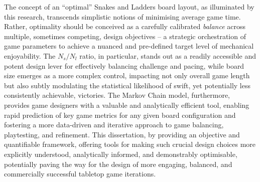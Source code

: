 The concept of an “optimal” Snakes and Ladders board layout, as illuminated by this research, transcends simplistic notions of minimising average game time.  Rather, optimality should be conceived as a carefully calibrated \textit{balance} across multiple, sometimes competing, design objectives – a strategic orchestration of game parameters to achieve a nuanced and pre-defined target level of mechanical enjoyability.  The $N_s/N_l$ ratio, in particular, stands out as a readily accessible and potent design lever for effectively balancing challenge and pacing, while board size emerges as a more complex control, impacting not only overall game length but also subtly modulating the statistical likelihood of swift, yet potentially less consistently achievable, victories.  The Markov Chain model, furthermore, provides game designers with a valuable and analytically efficient tool, enabling rapid prediction of key game metrics for any given board configuration and fostering a more data-driven and iterative approach to game balancing, playtesting, and refinement. This dissertation, by providing an objective and quantifiable framework, offering tools for making such crucial design choices more explicitly understood, analytically informed, and demonstrably optimisable, potentially paving the way for the design of more engaging, balanced, and commercially successful tabletop game iterations.


